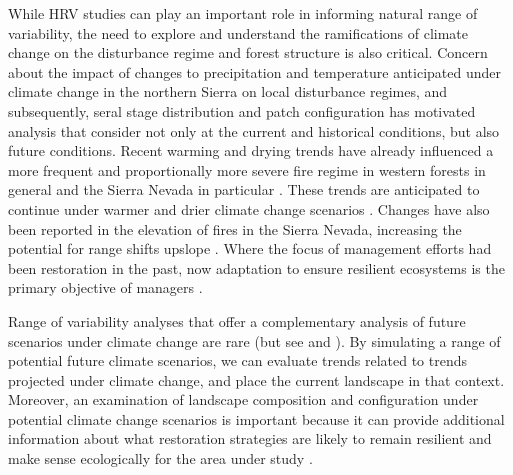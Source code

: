 
While HRV studies can play an important role in informing natural range of variability, the need to explore and understand the ramifications of climate change on the disturbance regime and forest structure is also critical. Concern about the impact of changes to precipitation and temperature anticipated under climate change in the northern Sierra on local disturbance regimes, and subsequently, seral stage distribution and patch configuration has motivated analysis that consider not only at the current and historical conditions, but also future conditions\citep{Fule2008,North2012}.
%
Recent warming and drying trends have already influenced a more frequent and proportionally more severe fire regime in western forests in general and the Sierra Nevada in particular \citep{McKenzie2004,Westerling2011,Miller2012}. These trends are anticipated to continue under warmer and drier climate change scenarios \citep{Westerling2008,Dale2001}. Changes have also been reported in the elevation of fires in the Sierra Nevada, increasing the potential for range shifts upslope \citep{Schwartz2015}. Where the focus of management efforts had been restoration in the past, now adaptation to ensure resilient ecosystems is the primary objective of managers \citep{Stephens2010}.

Range of variability analyses that offer a complementary analysis of future scenarios under climate change are rare (but see \cite{Keane2008} and \cite{Duveneck2014}). By simulating a range of potential future climate scenarios, we can evaluate trends related to trends projected under climate change, and place the current landscape in that context. Moreover, an examination of landscape composition and configuration under potential climate change scenarios is important because it can provide additional information about what restoration strategies are likely to remain resilient and make sense ecologically for the area under study \citep{Duncan2010}.

